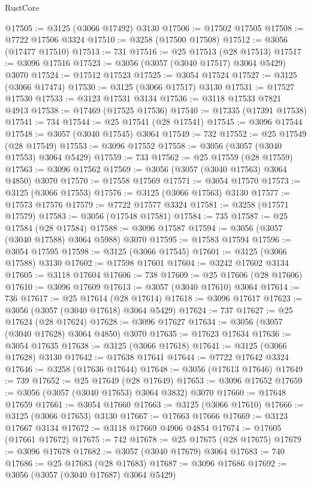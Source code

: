 \begin{lexlean}{RustCore}
\begin{coremodule}
@17505 := @3125 (@3066 @17492) @3130
@17506 := @17502 @17505
@17508 := @7722 @17506 @3324
@17510 := @3258 (@17500 @17508)
@17512 := @3056 (@17477 @17510)
@17513 := 731
@17516 := @25 @17513 (@28 @17513)
@17517 := @3096 @17516
@17523 := @3056 (@3057 (@3040 @17517) @3064 @5429) @3070
@17524 := @17512 @17523
@17525 := @3054 @17524
@17527 := @3125 (@3066 @17474)
@17530 := @3125 (@3066 @17517) @3130
@17531 := @17527 @17530
@17533 := @3123 @17531 @3134
@17536 := @3118 @17533 @7821 @4913
@17538 := @17469 (@17525 @17536)
@17540 := @17335 (@17391 @17538)
@17541 := 734
@17544 := @25 @17541 (@28 @17541)
@17545 := @3096 @17544
@17548 := @3057 (@3040 @17545) @3064
@17549 := 732
@17552 := @25 @17549 (@28 @17549)
@17553 := @3096 @17552
@17558 := @3056 (@3057 (@3040 @17553) @3064 @5429)
@17559 := 733
@17562 := @25 @17559 (@28 @17559)
@17563 := @3096 @17562
@17569 := @3056 (@3057 (@3040 @17563) @3064 @4850) @3070
@17570 := @17558 @17569
@17571 := @3054 @17570
@17573 := @3125 (@3066 @17553)
@17576 := @3125 (@3066 @17563) @3130
@17577 := @17573 @17576
@17579 := @7722 @17577 @3324
@17581 := @3258 (@17571 @17579)
@17583 := @3056 (@17548 @17581)
@17584 := 735
@17587 := @25 @17584 (@28 @17584)
@17588 := @3096 @17587
@17594 := @3056 (@3057 (@3040 @17588) @3064 @5988) @3070
@17595 := @17583 @17594
@17596 := @3054 @17595
@17598 := @3125 (@3066 @17545)
@17601 := @3125 (@3066 @17588) @3130
@17602 := @17598 @17601
@17604 := @3242 @17602 @3134
@17605 := @3118 @17604
@17606 := 738
@17609 := @25 @17606 (@28 @17606)
@17610 := @3096 @17609
@17613 := @3057 (@3040 @17610) @3064
@17614 := 736
@17617 := @25 @17614 (@28 @17614)
@17618 := @3096 @17617
@17623 := @3056 (@3057 (@3040 @17618) @3064 @5429)
@17624 := 737
@17627 := @25 @17624 (@28 @17624)
@17628 := @3096 @17627
@17634 := @3056 (@3057 (@3040 @17628) @3064 @4850) @3070
@17635 := @17623 @17634
@17636 := @3054 @17635
@17638 := @3125 (@3066 @17618)
@17641 := @3125 (@3066 @17628) @3130
@17642 := @17638 @17641
@17644 := @7722 @17642 @3324
@17646 := @3258 (@17636 @17644)
@17648 := @3056 (@17613 @17646)
@17649 := 739
@17652 := @25 @17649 (@28 @17649)
@17653 := @3096 @17652
@17659 := @3056 (@3057 (@3040 @17653) @3064 @3832) @3070
@17660 := @17648 @17659
@17661 := @3054 @17660
@17663 := @3125 (@3066 @17610)
@17666 := @3125 (@3066 @17653) @3130
@17667 := @17663 @17666
@17669 := @3123 @17667 @3134
@17672 := @3118 @17669 @4906 @4854
@17674 := @17605 (@17661 @17672)
@17675 := 742
@17678 := @25 @17675 (@28 @17675)
@17679 := @3096 @17678
@17682 := @3057 (@3040 @17679) @3064
@17683 := 740
@17686 := @25 @17683 (@28 @17683)
@17687 := @3096 @17686
@17692 := @3056 (@3057 (@3040 @17687) @3064 @5429)

\end{coremodule}
\end{lexlean}
